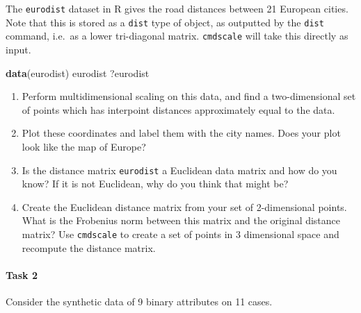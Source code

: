 \documentclass[
]{book}
\newenvironment{Shaded}{\begin{snugshade}}{\end{snugshade}}
\newcommand{\FunctionTok}[1]{\textcolor[rgb]{0.13,0.29,0.53}{\textbf{#1}}}
\newcommand{\NormalTok}[1]{#1}
\theoremstyle{definition}
\theoremstyle{definition}
\theoremstyle{definition}
\theoremstyle{definition}
\theoremstyle{remark}
\begin{document}
The \texttt{eurodist} dataset in R gives the road distances between 21 European cities. Note that this is stored as a \texttt{dist} type of object, as outputted by the \texttt{dist} command, i.e.~as a lower tri-diagonal matrix. \texttt{cmdscale} will take this directly as input.

\begin{Shaded}
\begin{Highlighting}[]
\FunctionTok{data}\NormalTok{(eurodist)}
\NormalTok{eurodist}
\NormalTok{?eurodist}
\end{Highlighting}
\end{Shaded}

\begin{enumerate}
\def\labelenumi{\roman{enumi}.}
\item
  Perform multidimensional scaling on this data, and find a two-dimensional set of points which has interpoint distances approximately equal to the data.
\item
  Plot these coordinates and label them with the city names. Does your plot look like the map of Europe?
\item
  Is the distance matrix \texttt{eurodist} a Euclidean data matrix and how do you know? If it is not Euclidean, why do you think that might be?
\item
  Create the Euclidean distance matrix from your set of 2-dimensional points. What is the Frobenius norm between this matrix and the original distance matrix? Use \texttt{cmdscale} to create a set of points in 3 dimensional space and recompute the distance matrix.
\end{enumerate}

\hypertarget{task-2-1}{%
\paragraph*{Task 2}\label{task-2-1}}

Consider the synthetic data of 9 binary attributes on 11 cases.
\end{document}
